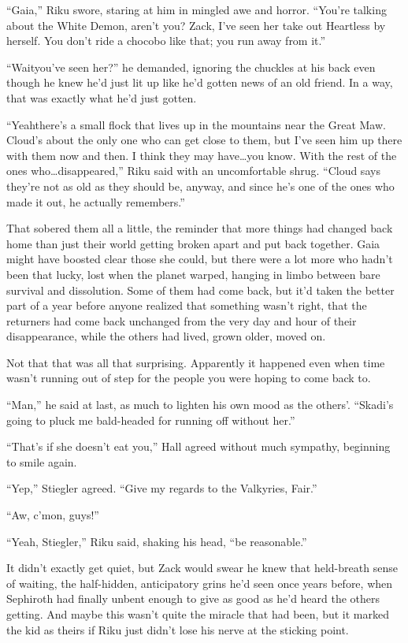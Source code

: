``Gaia,'' Riku swore, staring at him in mingled awe and horror. ``You're talking about the White Demon, aren't you? Zack, I've seen her take out Heartless by herself. You don't ride a chocobo like that; you run away from it.''

``Wait\textemdash you've seen her?'' he demanded, ignoring the chuckles at his back even though he knew he'd just lit up like he'd gotten news of an old friend. In a way, that was exactly what he'd just gotten.

``Yeah\textemdash there's a small flock that lives up in the mountains near the Great Maw. Cloud's about the only one who can get close to them, but I've seen him up there with them now and then. I think they may have\ldots you know. With the rest of the ones who\ldots disappeared,'' Riku said with an uncomfortable shrug. ``Cloud says they're not as old as they should be, anyway, and since he's one of the ones who made it out, he actually remembers.''

That sobered them all a little, the reminder that more things had changed back home than just their world getting broken apart and put back together. Gaia might have boosted clear those she could, but there were a lot more who hadn't been that lucky, lost when the planet warped, hanging in limbo between bare survival and dissolution. Some of them had come back, but it'd taken the better part of a year before anyone realized that something wasn't right, that the returners had come back unchanged from the very day and hour of their disappearance, while the others had lived, grown older, moved on.

Not that that was all that surprising. Apparently it happened even when time wasn't running out of step for the people you were hoping to come back to.

``Man,'' he said at last, as much to lighten his own mood as the others'. ``Skadi's going to pluck me bald-headed for running off without her.''

``That's if she doesn't eat you,'' Hall agreed without much sympathy, beginning to smile again.

``Yep,'' Stiegler agreed. ``Give my regards to the Valkyries, Fair.''

``Aw, c'mon, guys!''

``Yeah, Stiegler,'' Riku said, shaking his head, ``be reasonable.''

It didn't exactly get quiet, but Zack would swear he knew that held-breath sense of waiting, the half-hidden, anticipatory grins he'd seen once years before, when Sephiroth had finally unbent enough to give as good as he'd heard the others getting. And maybe this wasn't quite the miracle that had been, but it marked the kid as theirs if Riku just didn't lose his nerve at the sticking point.

